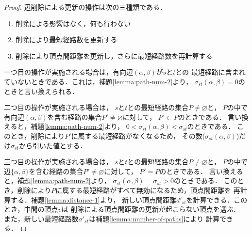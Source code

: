 \begin{proof}
  辺削除による更新の操作は次の三種類である．
  \begin{enumerate}
  \item 削除による影響はなく，何も行わない
  \item 削除により最短経路数を更新する
  \item 削除により頂点間距離を更新し，さらに最短経路数を再計算する
  \end{enumerate}

  一つ目の操作が実施される場合は，有向辺$(\alpha,\beta)$が$s$と$t$との
  最短経路に含まれていないときである．これは，補題\ref{lemma:path-num-2}より，
  $\sigma_{st}(\alpha,\beta)=0$のときと言い換えられる．

  二つ目の操作が実施される場合は，
  $s$と$t$との最短経路の集合$P\neq\varnothing$と，
  $P$の中で有向辺$(\alpha,\beta)$を含む経路の集合$P'\neq\varnothing$に対して，
  $P'\subset P$のときである．
  言い換えると，補題\ref{lemma:path-num-2}より，
  $0<\sigma_{st}(\alpha,\beta)<\sigma_{st}$のときである．
  このとき，削除により$P'$に属する最短経路がなくなるため，
  その数($\sigma_{st}(\alpha,\beta)$)だけ$\sigma_{st}$から引いた値とする．

  三つ目の操作が実施される場合は，
  $s$と$t$との最短経路の集合$P\neq\varnothing$と，
  $P$の中で辺$\{\alpha,\beta\}$を含む経路の集合$P'\neq\varnothing$に対して，
  $P'=P$のときである．
  言い換えると，補題\ref{lemma:path-num-2}より，
  $\sigma_{st}(\alpha,\beta)=\sigma_{st}>0$のときである．
  このとき，削除により$P$に属する最短経路がすべて無効になるため，頂点間距離を
  再計算する．補題\ref{lemma:distance-1}より，
  新しい頂点間距離$d'_{st}$を計算できる．このとき，中間の頂点$v$は
  削除による頂点間距離の更新が起こらない頂点を選ぶ．
  また，新しい最短経路数$\sigma'_{st}$は補題\ref{lemma:number-of-paths}により
  計算できる．
\end{proof}

